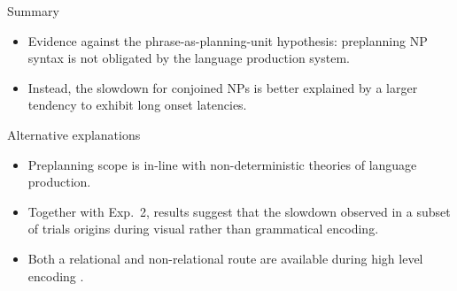 
\begin{frame}{Summary}
	\begin{itemize}
		\item Evidence against the phrase-as-planning-unit hypothesis: preplanning NP syntax is not obligated by the language production system.
		\item Instead, the slowdown for conjoined NPs \parencite[as in][]{martin2010planning,smi99} is better explained by a larger tendency to exhibit long onset latencies.
	\end{itemize}
\end{frame}

\begin{frame}{Alternative explanations}
	\begin{itemize}
		\item Preplanning scope is in-line with non-deterministic theories of language production.		
		\item Together with Exp.~2, results suggest that the slowdown observed in a subset of trials origins during visual rather than grammatical encoding. 
		\item Both a relational and non-relational route are available during high level encoding \parencite{kuchinsky2011reversing,konopka2014priming}. 
	\end{itemize}
\end{frame}

